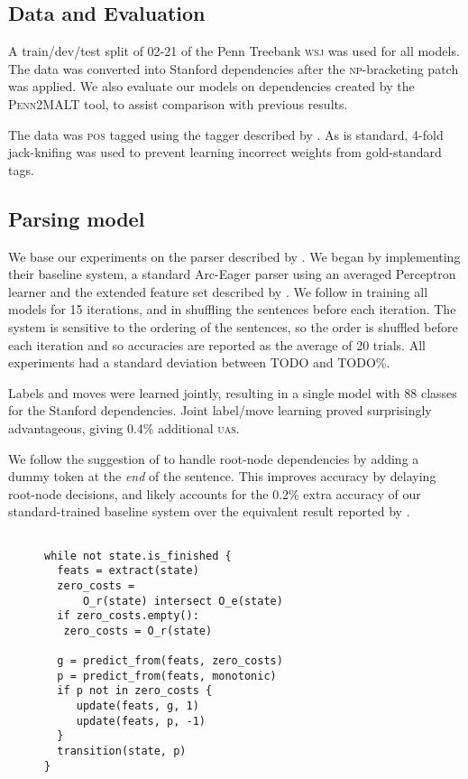 \documentclass[11pt,letterpaper]{article}
\newcommand{\uas}{\textsc{uas}\xspace}
\newcommand{\pos}{\textsc{pos}\xspace}
\begin{document}
\subsection{Data and Evaluation}

A train/dev/test split of 02-21 of the Penn Treebank \textsc{wsj} \citep{marcus:94}
was used for all models. The data was converted into
Stanford dependencies \citep{stanford_deps} after the \citet{vadas:07}
\textsc{np}-bracketing patch was applied. We also evaluate our models on
dependencies created by the \textsc{Penn2MALT} tool, to assist comparison 
with previous results.

The data was \pos tagged using the tagger described by \citep{zhang_pos:11}.
As is standard, 4-fold jack-knifing was used to prevent learning incorrect
weights from gold-standard tags.

\subsection{Parsing model}

We base our experiments on the parser described by \citet{goldberg:12}. We
began by implementing their baseline system, a standard Arc-Eager parser using
an averaged Perceptron learner and the extended feature set described by \citet{zhang:11}.
We follow \citeauthor{goldberg:12} in training all models for 15 iterations,
and in shuffling the sentences before each iteration.
The system is sensitive to the ordering of the sentences, so
the order is shuffled before each iteration and
so accuracies are reported as the average of 20 trials. All experiments had a
standard deviation between TODO and TODO\%.

Labels and moves were learned jointly, resulting in a single model with 88 classes
for the Stanford dependencies. Joint label/move learning proved surprisingly
advantageous, giving 0.4\% additional \uas.

We follow the suggestion of \citet{nivre:squib} to handle root-node dependencies by
adding a dummy token at the \emph{end} of the sentence.
This improves accuracy by delaying root-node decisions, and likely accounts for the
0.2\% extra accuracy of our standard-trained baseline system over the equivalent result
reported by \citet{goldberg:12}.

\begin{figure}
\begin{verbatim}

while not state.is_finished {
  feats = extract(state)
  zero_costs =
      O_r(state) intersect O_e(state)
  if zero_costs.empty():
   zero_costs = O_r(state)

  g = predict_from(feats, zero_costs)
  p = predict_from(feats, monotonic)
  if p not in zero_costs {
     update(feats, g, 1)
     update(feats, p, -1)
  }
  transition(state, p)
}
\end{verbatim}
\end{figure}
\end{document}
